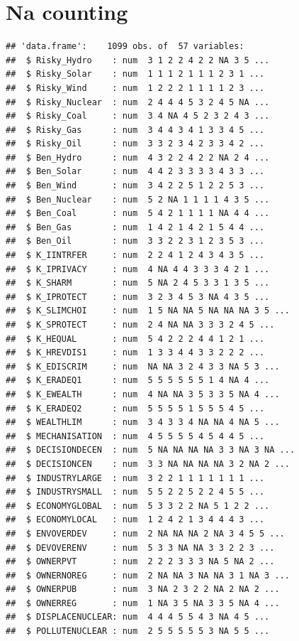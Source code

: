 \documentclass[
]{article}
\begin{document}
\hypertarget{na-counting}{%
\section{Na counting}\label{na-counting}}

\begin{verbatim}
## 'data.frame':    1099 obs. of  57 variables:
##  $ Risky_Hydro    : num  3 1 2 2 4 2 2 NA 3 5 ...
##  $ Risky_Solar    : num  1 1 1 2 1 1 1 2 3 1 ...
##  $ Risky_Wind     : num  1 2 2 2 1 1 1 1 2 3 ...
##  $ Risky_Nuclear  : num  2 4 4 4 5 3 2 4 5 NA ...
##  $ Risky_Coal     : num  3 4 NA 4 5 2 3 2 4 3 ...
##  $ Risky_Gas      : num  3 4 4 3 4 1 3 3 4 5 ...
##  $ Risky_Oil      : num  3 3 2 3 4 2 3 3 4 2 ...
##  $ Ben_Hydro      : num  4 3 2 2 4 2 2 NA 2 4 ...
##  $ Ben_Solar      : num  4 4 2 3 3 3 3 4 3 3 ...
##  $ Ben_Wind       : num  3 4 2 2 5 1 2 2 5 3 ...
##  $ Ben_Nuclear    : num  5 2 NA 1 1 1 1 4 3 5 ...
##  $ Ben_Coal       : num  5 4 2 1 1 1 1 NA 4 4 ...
##  $ Ben_Gas        : num  1 4 2 1 4 2 1 5 4 4 ...
##  $ Ben_Oil        : num  3 3 2 2 3 1 2 3 5 3 ...
##  $ K_IINTRFER     : num  2 2 4 1 2 4 3 4 3 5 ...
##  $ K_IPRIVACY     : num  4 NA 4 4 3 3 3 4 2 1 ...
##  $ K_SHARM        : num  5 NA 2 4 5 3 3 1 3 5 ...
##  $ K_IPROTECT     : num  3 2 3 4 5 3 NA 4 3 5 ...
##  $ K_SLIMCHOI     : num  1 5 NA NA 5 NA NA NA 3 5 ...
##  $ K_SPROTECT     : num  2 4 NA NA 3 3 3 2 4 5 ...
##  $ K_HEQUAL       : num  5 4 2 2 2 4 4 1 2 1 ...
##  $ K_HREVDIS1     : num  1 3 3 4 4 3 3 2 2 2 ...
##  $ K_EDISCRIM     : num  NA NA 3 2 4 3 3 NA 5 3 ...
##  $ K_ERADEQ1      : num  5 5 5 5 5 5 1 4 NA 4 ...
##  $ K_EWEALTH      : num  4 NA NA 3 5 3 3 5 NA 4 ...
##  $ K_ERADEQ2      : num  5 5 5 5 1 5 5 5 4 5 ...
##  $ WEALTHLIM      : num  3 4 3 3 4 NA NA 4 NA 5 ...
##  $ MECHANISATION  : num  4 5 5 5 5 4 5 4 4 5 ...
##  $ DECISIONDECEN  : num  5 NA NA NA NA 3 3 NA 3 NA ...
##  $ DECISIONCEN    : num  3 3 NA NA NA NA 3 2 NA 2 ...
##  $ INDUSTRYLARGE  : num  3 2 2 1 1 1 1 1 1 1 ...
##  $ INDUSTRYSMALL  : num  5 5 2 2 5 2 2 4 5 5 ...
##  $ ECONOMYGLOBAL  : num  5 3 3 2 2 NA 5 1 2 2 ...
##  $ ECONOMYLOCAL   : num  1 2 4 2 1 3 4 4 4 3 ...
##  $ ENVOVERDEV     : num  2 NA NA NA 2 NA 3 4 5 5 ...
##  $ DEVOVERENV     : num  5 3 3 NA NA 3 3 2 2 3 ...
##  $ OWNERPVT       : num  2 2 2 3 3 3 NA 5 NA 2 ...
##  $ OWNERNOREG     : num  2 NA NA 3 NA NA 3 1 NA 3 ...
##  $ OWNERPUB       : num  3 NA 2 3 2 2 NA 2 NA 2 ...
##  $ OWNERREG       : num  1 NA 3 5 NA 3 3 5 NA 4 ...
##  $ DISPLACENUCLEAR: num  4 4 4 5 5 4 3 NA 4 5 ...
##  $ POLLUTENUCLEAR : num  2 5 5 5 5 5 3 NA 5 5 ...

\end{verbatim}
\end{document}
